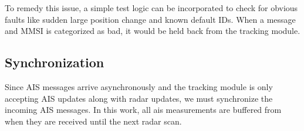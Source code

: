 To remedy this issue, a simple test logic can be incorporated to check for obvious faults like sudden large position change and known default IDs. When a message and MMSI is categorized as bad, it would be held back from the tracking module. 

\subsection{Synchronization}
Since AIS messages arrive asynchronously and the tracking module is only accepting AIS updates along with radar updates, we must synchronize the incoming AIS messages. In this work, all \gls{ais} measurements are buffered from when they are received until the next radar scan.